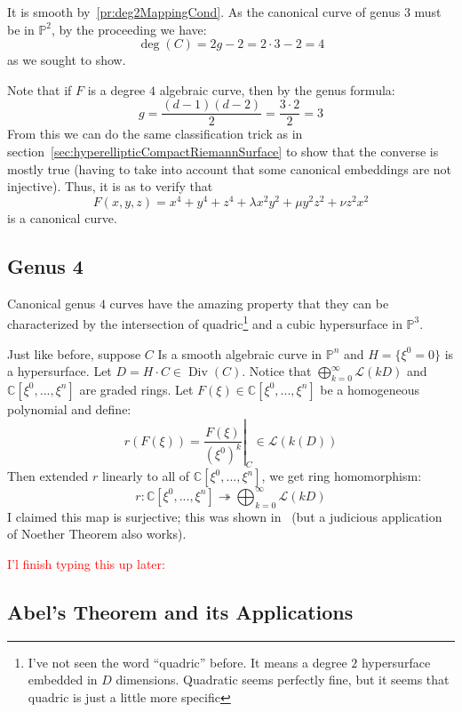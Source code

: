 \documentclass{book}
\newcommand{\C}{{\mathbb{C}}}
\renewcommand{\P}{{\mathbb{P}}}
\newcommand{\CL}{{\mathcal{L}}}
\newcommand{\Div}{{\operatorname{Div}}}
\begin{document}
\begin{Proof}
  It is smooth by~\cref{pr:deg2MappingCond}. As the canonical curve of genus $3$ must be in $\P^2$, by the proceeding we have:
  \[
    \deg(C) = 2g-2 = 2\cdot 3 - 2 = 4
  \]
  as we sought to show.
\end{Proof}

Note that if $F$ is a degree $4$ algebraic curve, then by the genus formula:
\[
  g = \frac{(d-1)(d-2)}{2} = \frac{3\cdot 2}{2} = 3
\]
From this we can do the same classification trick as in section~\ref{sec:hyperellipticCompactRiemannSurface}
to show that the converse is mostly true (having to take into account that some canonical embeddings are not
injective). Thus, it is as to verify that
\[
  F(x, y, z) = x^4 + y^4 + z^4 + \lambda x^2 y^2 + \mu y^2 z^2 + \nu z^2 x^2
\]
is a canonical curve.



\subsection{Genus 4}

Canonical genus $4$ curves have the amazing property that they can be characterized by the intersection of
quadric\footnote{I've not seen the word ``quadric'' before. It means a degree $2$ hypersurface embedded in
$D$ dimensions. Quadratic seems perfectly fine, but it seems that quadric is just a little more specific} and
a cubic hypersurface in $\P^3$.

Just like before, suppose $C$ Is a smooth algebraic curve in $\P^n$ and $H = \{\xi^0 = 0\}$ is a hypersurface.
Let $D = H\cdot C  \in \Div(C)$.  Notice that $\bigoplus_{k=0}^\infty \CL(kD)$ and $\C[\xi^0, ..., \xi^n]$ are
graded rings. Let $F(\xi) \in \C[\xi^0, ..., \xi^n]$ be a homogeneous polynomial and define:
\[
  r(F(\xi)) = \left.\frac{F(\xi)}{\left(\xi^0\right)^k}\right|_{C} \in \CL(k(D))
\]
Then extended $r$ linearly to all of $\C[\xi^0, ..., \xi^n]$, we get  ring homomorphism:
\[
  r: \C[\xi^0, ...,\xi^n] \twoheadrightarrow \bigoplus_{k=0}^\infty \CL(kD)
\]
I claimed this map is surjective; this was shown in~\cite{NateAlgGeo} (but a judicious application of Noether
Theorem also works).

\textcolor{red}{I'l finish typing this up later: } \cite[p.148]{a.griffithsIntroductionAlgebraicCurves}

\subsection{Abel's Theorem and its Applications}
\end{document}
